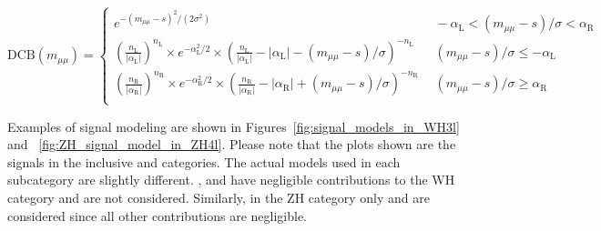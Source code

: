\begin{equation}
  \label{eq:dCBFunction}
  \text{DCB}(m_{\mu\mu})=%
    \begin{cases}
        e^{-(m_{\mu\mu} - s)^{2}/(2\sigma^{2})} & \ \ -\alpha_{\mathrm{L}} < (m_{\mu\mu}-s)/\sigma < \alpha_{\mathrm{R}} \\
        (\frac{n_{\mathrm{L}}}{|\alpha_{\mathrm{L}}|})^{n_{\mathrm{L}}} \times e^{-\alpha^{2}_{\mathrm{L}}/2} \times (\frac{n_{\mathrm{L}}}{|\alpha_{\mathrm{L}}|} - |\alpha_{\mathrm{L}}| - (m_{\mu\mu}-s)/\sigma)^{-n_{\mathrm{L}}}
        & \ \ (m_{\mu\mu}-s)/\sigma \leq -\alpha_{\mathrm{L}} \\
        (\frac{n_{\mathrm{R}}}{|\alpha_{\mathrm{R}}|})^{n_{\mathrm{R}}} \times e^{-\alpha^{2}_{\mathrm{R}}/2} \times (\frac{n_{\mathrm{R}}}{|\alpha_{\mathrm{R}}|} - |\alpha_{\mathrm{R}}| + (m_{\mu\mu}-s)/\sigma)^{-n_{\mathrm{R}}}
        & \ \ (m_{\mu\mu}-s)/\sigma \geq \alpha_{\mathrm{R}} \\
    \end{cases}
\end{equation}

Examples of signal modeling are shown in Figures~\ref{fig:signal_models_in_WH3l} and ~\ref{fig:ZH_signal_model_in_ZH4l}. 
Please note that the plots shown are the signals in the inclusive \WH and \ZH categories. 
The actual models used in each subcategory are slightly different. 
\ggH, \qqH and \bbH have negligible contributions to the WH category and are not considered.  
Similarly, in the ZH category only \qqZH and \ggZH are considered since all other contributions are negligible. 

